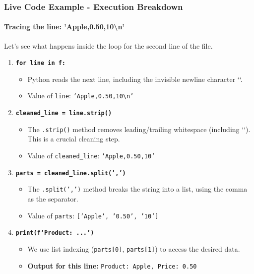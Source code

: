 \documentclass{beamer}
\begin{document}
\begin{frame}[fragile]
    \frametitle{Live Code Example - Execution Breakdown}
    \framesubtitle{Tracing the line: 'Apple,0.50,10\textbackslash n'}
    
    Let's see what happens inside the loop for the second line of the file.
    
    \begin{enumerate}
        \item \textbf{\texttt{for line in f:}}
        \begin{itemize}
            \item Python reads the next line, including the invisible newline character `\n`.
            \item Value of \texttt{line}: \texttt{'Apple,0.50,10\textbackslash n'}
        \end{itemize}
        
        \item \textbf{\texttt{cleaned\_line = line.strip()}}
        \begin{itemize}
            \item The \texttt{.strip()} method removes leading/trailing whitespace (including `\n`). This is a crucial cleaning step.
            \item Value of \texttt{cleaned\_line}: \texttt{'Apple,0.50,10'}
        \end{itemize}
        
        \item \textbf{\texttt{parts = cleaned\_line.split(',')}}
        \begin{itemize}
            \item The \texttt{.split(',')} method breaks the string into a list, using the comma as the separator.
            \item Value of \texttt{parts}: \texttt{['Apple', '0.50', '10']}
        \end{itemize}

        \item \textbf{\texttt{print(f'Product: ...')}}
        \begin{itemize}
            \item We use list indexing (\texttt{parts[0]}, \texttt{parts[1]}) to access the desired data.
            \item \textbf{Output for this line:} \texttt{Product: Apple, Price: 0.50}
        \end{itemize}
    \end{enumerate}
\end{frame}
\end{document}
